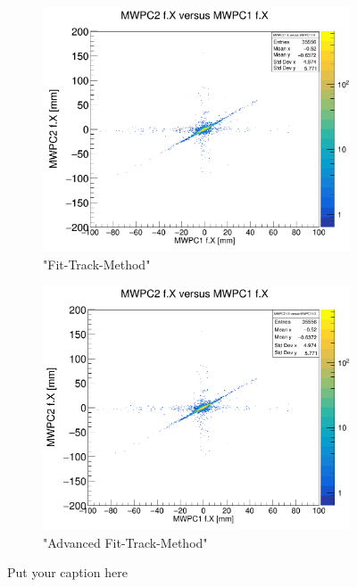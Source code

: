 \documentclass[12pt, letterpaper]{article}
\begin{document}
\begin{figure}[!htbp]
\begin{subfigure}{.5\textwidth}
\end{subfigure}
\begin{subfigure}{.5\textwidth}
  \centering
  \includegraphics[width=.9\linewidth]{plot_imgs/mw2_mw1_fit.png} 
  \caption{"Fit-Track-Method"}
  \label{fig:sub-second}
\end{subfigure}
\begin{subfigure}{.5\textwidth}
  \centering
  \includegraphics[width=.9\linewidth]{plot_imgs/mw2_mw1_last.png} 
  \caption{"Advanced Fit-Track-Method"}
  \label{fig:sub-second}
\end{subfigure}
\caption{Put your caption here}
\label{fig:fig}
\end{figure}
\FloatBarrier
\clearpage
\end{document}
